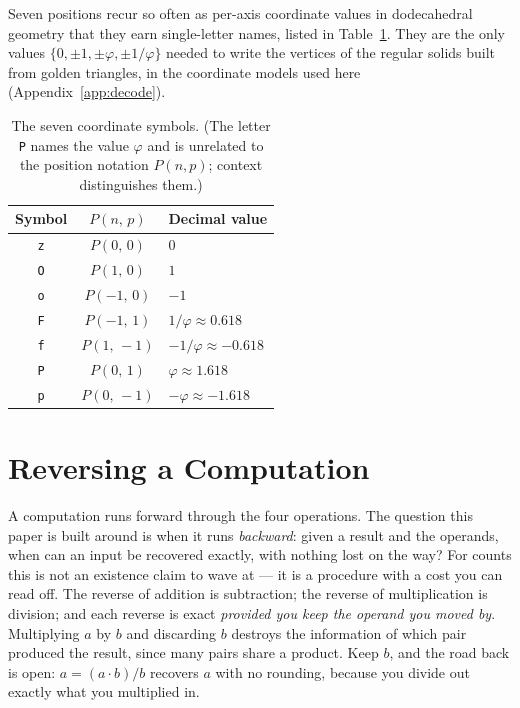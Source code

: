 \documentclass[11pt]{article}
\theoremstyle{definition}
\theoremstyle{remark}
\newcommand{\Pb}[2]{P(#1,\,#2)}
\begin{document}
Seven positions recur so often as per-axis coordinate values in dodecahedral
geometry that they earn single-letter names, listed in Table~\ref{tab:decode}.
They are the only values $\{0,\pm1,\pm\varphi,\pm1/\varphi\}$ needed to write the
vertices of the regular solids built from golden triangles, in the coordinate
models used here (Appendix~\ref{app:decode}).

\begin{table}[h]
\centering
\caption{The seven coordinate symbols. (The letter \texttt{P} names the value
  $\varphi$ and is unrelated to the position notation $P(n,p)$; context
  distinguishes them.)}
\label{tab:decode}
\begin{tabular}{ccl}
\toprule
Symbol & $\Pb{n}{p}$ & Decimal value \\
\midrule
\texttt{z} & $\Pb{0}{0}$  & $0$ \\
\texttt{O} & $\Pb{1}{0}$  & $1$ \\
\texttt{o} & $\Pb{-1}{0}$ & $-1$ \\
\texttt{F} & $\Pb{-1}{1}$ & $1/\varphi \approx 0.618$ \\
\texttt{f} & $\Pb{1}{-1}$ & $-1/\varphi \approx -0.618$ \\
\texttt{P} & $\Pb{0}{1}$  & $\varphi \approx 1.618$ \\
\texttt{p} & $\Pb{0}{-1}$ & $-\varphi \approx -1.618$ \\
\bottomrule
\end{tabular}
\end{table}

\section{Reversing a Computation}
\label{sec:reverse}

A computation runs forward through the four operations. The question this paper
is built around is when it runs \emph{backward}: given a result and the operands,
when can an input be recovered exactly, with nothing lost on the way? For counts
this is not an existence claim to wave at --- it is a procedure with a cost you
can read off. The reverse of addition is subtraction; the reverse of
multiplication is division; and each reverse is exact \emph{provided you keep the
operand you moved by}. Multiplying $a$ by $b$ and discarding $b$ destroys the
information of which pair produced the result, since many pairs share a product.
Keep $b$, and the road back is open: $a=(a\cdot b)/b$ recovers $a$ with no
rounding, because you divide out exactly what you multiplied in.
\end{document}
